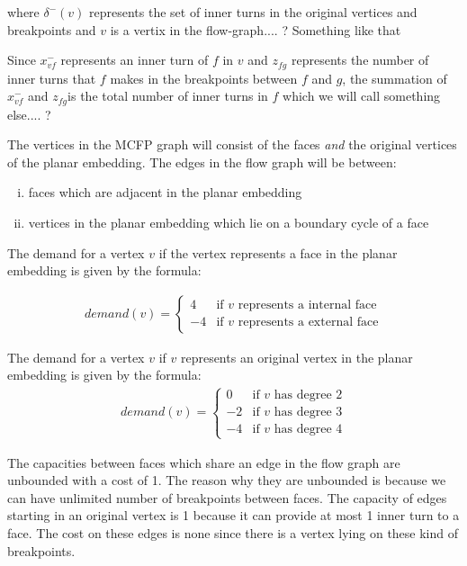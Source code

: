 \documentclass[12pt]{article}
\begin{document}
where $\delta^{-}(v)$ represents the set of inner turns in the original vertices and breakpoints and $v$ is a vertix in the flow-graph.... ? Something like that  

Since $x_{vf}^{-}$ represents an inner turn of $f$ in $v$ and $z_{fg}$ represents the number of inner turns that $f$ makes in the breakpoints between $f$ and $g$, the summation of $x_{vf}^{-}$ and $z_{fg} $is the total number of inner turns in $f$ which we will call something else.... ?

The vertices in the MCFP graph will consist of the faces \textit{and} the original vertices of the planar embedding. The edges in the flow graph will be between:

\begin{enumerate}[(i)]
  \item faces which are adjacent in the planar embedding
  \item vertices in the planar embedding which lie on a boundary cycle of a face
\end{enumerate}

The demand for a vertex $v$ if the vertex represents a face in the planar embedding is given by the formula:

\begin{align*}
    demand(v) = \begin{cases}
                  4  & \text{if } v \text{ represents a internal face}\\
                  -4 & \text{if } v \text{ represents a external face}
                \end{cases}
\end{align*}

The demand for a vertex $v$ if $v$ represents an original vertex in the planar embedding is given by the formula:
\begin{align*}
    demand(v) = \begin{cases}
                  0  & \text{if } v \text{ has degree 2} \\
                  -2 & \text{if } v \text{ has degree 3} \\
                  -4 & \text{if } v \text{ has degree 4}
                \end{cases}
\end{align*}

The capacities between faces which share an edge in the flow graph are unbounded with a cost of 1. The reason why they are unbounded is because we can have unlimited number of breakpoints between faces. The capacity of edges starting in an original vertex is 1 because it can provide at most 1 inner turn to a face. The cost on these edges is none since there is a vertex lying on these kind of breakpoints.
\end{document}

